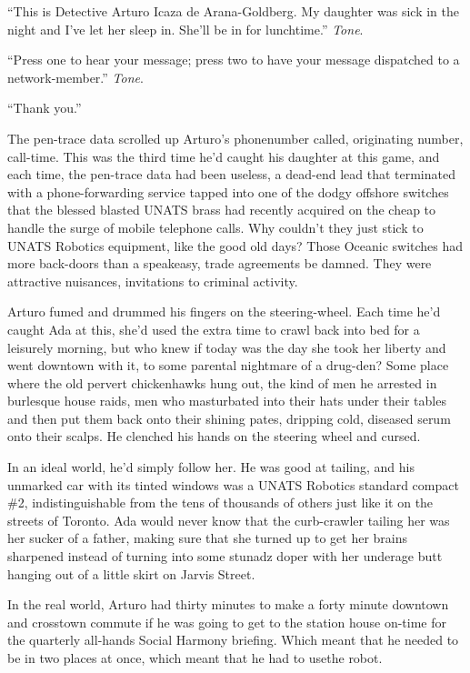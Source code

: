 “This is Detective Arturo Icaza de Arana-Goldberg. My daughter was
sick in the night and I’ve let her sleep in. She’ll be in for
lunchtime.” \emph{Tone}.

“Press one to hear your message; press two to have your message
dispatched to a network-member.” \emph{Tone}.

“Thank you.”

The pen-trace data scrolled up Arturo’s phone{\dash}number called,
originating number, call-time. This was the third time he’d caught
his daughter at this game, and each time, the pen-trace data had
been useless, a dead-end lead that terminated with a
phone-forwarding service tapped into one of the dodgy offshore
switches that the blessed blasted UNATS brass had recently acquired
on the cheap to handle the surge of mobile telephone calls. Why
couldn’t they just stick to UNATS Robotics equipment, like the good
old days? Those Oceanic switches had more back-doors than a
speakeasy, trade agreements be damned. They were attractive
nuisances, invitations to criminal activity.

Arturo fumed and drummed his fingers on the steering-wheel. Each
time he’d caught Ada at this, she’d used the extra time to crawl
back into bed for a leisurely morning, but who knew if today was
the day she took her liberty and went downtown with it, to some
parental nightmare of a drug-den? Some place where the old pervert
chickenhawks hung out, the kind of men he arrested in burlesque
house raids, men who masturbated into their hats under their tables
and then put them back onto their shining pates, dripping cold,
diseased serum onto their scalps. He clenched his hands on the
steering wheel and cursed.

In an ideal world, he’d simply follow her. He was good at tailing,
and his unmarked car with its tinted windows was a UNATS Robotics
standard compact \#2, indistinguishable from the tens of thousands
of others just like it on the streets of Toronto. Ada would never
know that the curb-crawler tailing her was her sucker of a father,
making sure that she turned up to get her brains sharpened instead
of turning into some stunadz doper with her underage butt hanging
out of a little skirt on Jarvis Street.

In the real world, Arturo had thirty minutes to make a forty minute
downtown and crosstown commute if he was going to get to the
station house on-time for the quarterly all-hands Social Harmony
briefing. Which meant that he needed to be in two places at once,
which meant that he had to use{\dash}the robot.


